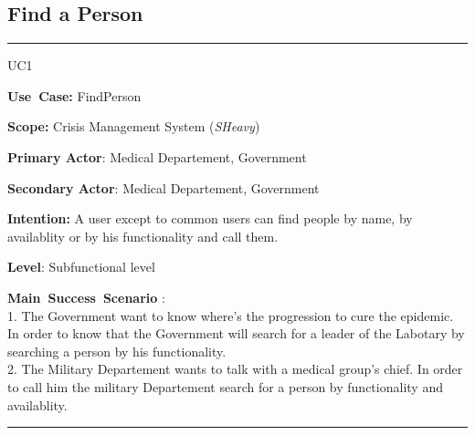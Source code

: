 \subsection{Find a Person}
\vspace{0.5cm}
\hrule
\vspace{0.5cm}
\begin{lyxlist}{UC1}
\small{
\item [\textbf{Use~Case:}] FindPerson
\item [\textbf{Scope:}] Crisis Management System (\emph{SHeavy})
\item [\textbf{Primary Actor}:] Medical Departement, Government
\item [\textbf{Secondary Actor}:] Medical Departement, Government
\item [\textbf{Intention:}]A user except to common users can find people by name, by availablity or by
his functionality and call them.
\item [\textbf{Level}:]Subfunctional level
\item [\textbf{Main~Success~Scenario}]:\\
1. The Government want to know where's the progression to cure the epidemic. In
order to know that the Government will search for a leader of the Labotary by
searching a person by his functionality.\\
2. The Military Departement wants to talk with a medical group's chief. In order
to call him the military Departement search for a person by functionality and
availablity.\\
}
\end{lyxlist}
\hrule 
\vspace{0.5cm} 

